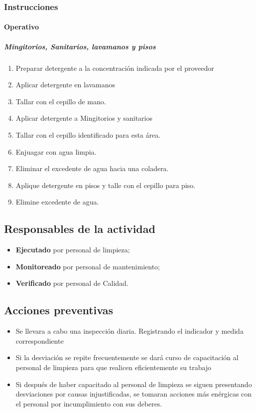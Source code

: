 \subsubsection{Instrucciones}

\paragraph{Operativo}

\subparagraph{Mingitorios, Sanitarios, lavamanos y pisos}

\begin{enumerate}
	\item Preparar detergente a la concentración indicada por el proveedor
	\item Aplicar detergente en lavamanos
	\item Tallar con el cepillo de mano.
	\item Aplicar detergente a Mingitorios y sanitarios
	\item Tallar con el cepillo identificado para esta área.
	\item Enjuagar con agua limpia.
	\item Eliminar el excedente de agua hacia una coladera.
	\item Aplique detergente en pisos y talle con el cepillo para piso.
	\item Elimine excedente de agua.
\end{enumerate}

\subsection{Responsables de la actividad}

\begin{itemize}
	\item \textbf{Ejecutado} por personal de limpieza;
	\item \textbf{Monitoreado} por personal de mantenimiento;
	\item \textbf{Verificado} por personal de Calidad.
\end{itemize}

\subsection{Acciones preventivas}

\begin{itemize}
	\item Se llevara a cabo una inspección diaria. Registrando el indicador y medida correspondiente
	\item Si la desviación se repite frecuentemente se dará curso de capacitación al personal de limpieza para que realicen eficientemente su trabajo
	\item Si después de haber capacitado al personal de limpieza se siguen presentando desviaciones por causas injustificadas, se tomaran acciones más enérgicas con el personal por incumplimiento con sus deberes.
\end{itemize}

